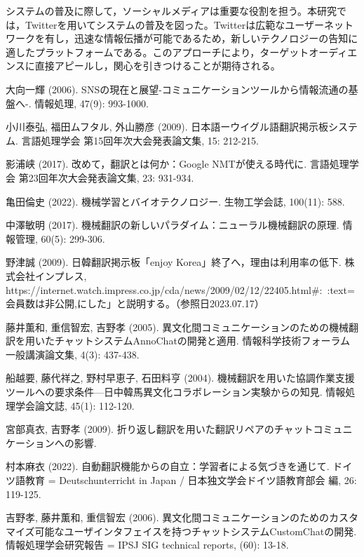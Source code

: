 \documentclass[b5paper,12pt]{jsreport}
\begin{document}
システムの普及に際して，ソーシャルメディアは重要な役割を担う。本研究では，Twitterを用いてシステムの普及を図った。Twitterは広範なユーザーネットワークを有し，迅速な情報伝播が可能であるため，新しいテクノロジーの告知に適したプラットフォームである。このアプローチにより，ターゲットオーディエンスに直接アピールし，関心を引きつけることが期待される。


\begin{thebibliography}{99}

大向一輝 (2006). SNSの現在と展望-コミュニケーションツールから情報流通の基盤へ-. 情報処理, 47(9): 993-1000.

小川泰弘, 福田ムフタル, 外山勝彦 (2009). 日本語ーウイグル語翻訳掲示板システム. 言語処理学会 第15回年次大会発表論文集, 15: 212-215.

影浦峡 (2017). 改めて，翻訳とは何か：Google NMTが使える時代に. 言語処理学会 第23回年次大会発表論文集, 23: 931-934.

亀田倫史 (2022). 機械学習とバイオテクノロジー. 生物工学会誌, 100(11): 588.

中澤敏明 (2017). 機械翻訳の新しいパラダイム：ニューラル機械翻訳の原理. 情報管理, 60(5): 299-306.

野津誠 (2009). 日韓翻訳掲示板「enjoy Korea」終了へ，理由は利用率の低下. 株式会社インプレス, https://internet.watch.impress.co.jp/cda/news/2009/02/12/22405.html\#:~:text=会員数は非公開,にした」と説明する。（参照日2023.07.17）

藤井薫和, 重信智宏, 吉野孝 (2005). 異文化間コミュニケーションのための機械翻訳を用いたチャットシステムAnnoChatの開発と適用. 情報科学技術フォーラム一般講演論文集, 4(3): 437-438.

船越要, 藤代祥之, 野村早恵子, 石田料亨 (2004). 機械翻訳を用いた協調作業支援ツールへの要求条件—日中韓馬異文化コラボレーション実験からの知見. 情報処理学会論文誌, 45(1): 112-120.

宮部真衣, 吉野孝 (2009). 折り返し翻訳を用いた翻訳リペアのチャットコミュニケーションへの影響.

村本麻衣 (2022). 自動翻訳機能からの自立：学習者による気づきを通じて. ドイツ語教育 = Deutschunterricht in Japan / 日本独文学会ドイツ語教育部会 編, 26: 119-125.

吉野孝, 藤井薫和, 重信智宏 (2006). 異文化間コミュニケーションのためのカスタマイズ可能なユーザインタフェイスを持つチャットシステムCustomChatの開発. 情報処理学会研究報告 = IPSJ SIG technical reports, (60): 13-18.


\end{thebibliography}
\end{document}
